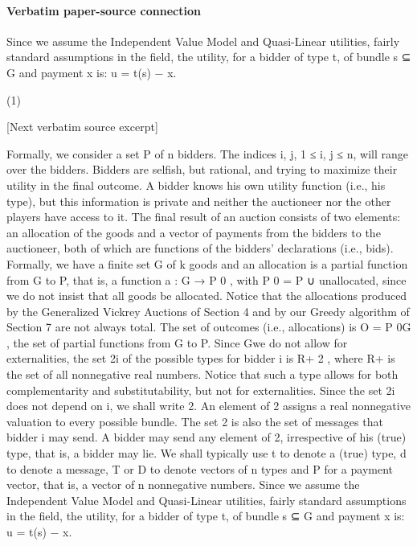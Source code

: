 \documentclass[10pt]{article}
\begin{document}
\paragraph{Verbatim paper-source connection}
\begin{ReviewVerbatim}
Since we assume the Independent Value Model and Quasi-Linear utilities, fairly
standard assumptions in the field, the utility, for a bidder of type t, of bundle s ⊆ G
and payment x is:
u = t(s) − x.

(1)

[Next verbatim source excerpt]

Formally, we consider a set P of n bidders. The indices i, j, 1 ≤ i, j ≤ n, will
range over the bidders. Bidders are selfish, but rational, and trying to maximize their
utility in the final outcome. A bidder knows his own utility function (i.e., his type),
but this information is private and neither the auctioneer nor the other players have
access to it. The final result of an auction consists of two elements: an allocation
of the goods and a vector of payments from the bidders to the auctioneer, both of
which are functions of the bidders’ declarations (i.e., bids). Formally, we have a
finite set G of k goods and an allocation is a partial function from G to P, that is, a
function a : G → P 0 , with P 0 = P ∪ {unallocated}, since we do not insist that all
goods be allocated. Notice that the allocations produced by the Generalized Vickrey
Auctions of Section 4 and by our Greedy algorithm of Section 7 are not always
total. The set of outcomes (i.e., allocations) is O = P 0G , the set of partial functions
from G to P. Since Gwe do not allow for externalities, the set 2i of the possible types
for bidder i is R+ 2 , where R+ is the set of all nonnegative real numbers. Notice
that such a type allows for both complementarity and substitutability, but not for
externalities. Since the set 2i does not depend on i, we shall write 2. An element
of 2 assigns a real nonnegative valuation to every possible bundle. The set 2 is
also the set of messages that bidder i may send. A bidder may send any element of
2, irrespective of his (true) type, that is, a bidder may lie. We shall typically use t
to denote a (true) type, d to denote a message, T or D to denote vectors of n types
and P for a payment vector, that is, a vector of n nonnegative numbers.
Since we assume the Independent Value Model and Quasi-Linear utilities, fairly
standard assumptions in the field, the utility, for a bidder of type t, of bundle s ⊆ G
and payment x is:
u = t(s) − x.


\end{ReviewVerbatim}
\end{document}
